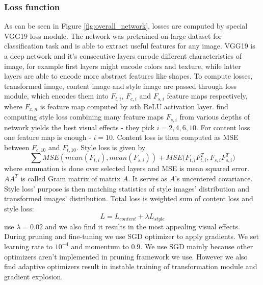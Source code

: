 \documentclass[../Main.tex]{subfiles}
\begin{document}
    \subsubsection{Loss function}
    As can be seen in Figure \ref{fig:overall_network}, losses are computed by
    special VGG19 loss module. The network was pretrained on large dataset for classification
    task and is able to extract useful features for any image. 
    VGG19 is a deep network and it's consecutive
    layers encode different characteristics of image, for example first layers might
    encode colors and texture, while latter layers are able to encode more abstract features like shapes.
    To compute losses, transformed image, content image and
    style image are passed through loss module, which encodes them into $F_{t,i}$, $F_{c,i}$ and 
    $F_{s,i}$ feature maps respectively, where $F_{x,n}$ is feature map computed by $n$th
    ReLU activation layer. \cite{Li2018} find computing style loss combining many 
    feature maps $F_{s,i}$ from various depths of network yields the best visual effects - they pick $i=2,4,6,10$. For 
    content loss one feature map is enough - $i=10$. Content loss is then computed as 
    MSE between $F_{c,10}$ and $F_{t,10}$. Style loss is given by 
    \[ \sum{MSE(mean(F_{t,i}), mean(F_{s,i})) + MSE(F_{t,i}F_{t,i}^T, F_{s,i}F_{s,i}^T}) \]
    where summation is done over selected layers and MSE is mean squared error.
    $AA^T$ is called Gram matrix of matrix $A$. It serves as $A$'s uncentered covariance.
    Style loss' purpose is then matching statistics of
    style images' distribution and transformed images' distribution.
    Total loss is weighted sum of content loss and style loss:
    \[L=L_{content} + \lambda L_{style}\] \cite{Li2018} use $\lambda=0.02$ and we 
    also find it results in the most appealing visual effects. During pruning and 
    fine-tuning we use SGD optimizer to apply gradients. We set learning rate to $10^{-4}$
    and momentum to $0.9$. We use SGD mainly because other optimizers aren't implemented 
    in pruning framework we use. However we also find adaptive optimizers result 
    in instable training of transformation module and gradient explosion.
    
\end{document}
